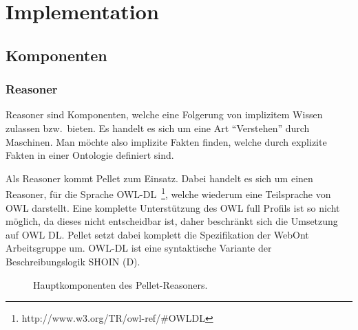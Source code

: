 \chapter{Implementation}
\label{chap:implementation}


\section{Komponenten}
\label{sec:komponenten}

\subsection{Reasoner}
\label{subsec:reasoner}
Reasoner sind Komponenten, welche eine Folgerung von implizitem Wissen zulassen bzw.\ bieten. Es handelt es sich um eine Art ``Verstehen'' durch Maschinen. Man möchte also implizite Fakten finden, welche durch explizite Fakten in einer Ontologie definiert sind. 

Als Reasoner kommt Pellet zum Einsatz. Dabei handelt es sich um einen Reasoner, für die Sprache OWL-DL~\footnote{http://www.w3.org/TR/owl-ref/\#OWLDL}, welche wiederum eine Teilsprache von OWL darstellt. Eine komplette Unterstützung des OWL full Profils ist so nicht möglich, da dieses nicht entscheidbar ist, daher beschränkt sich die Umsetzung auf OWL DL\@. Pellet setzt dabei komplett die Spezifikation der WebOnt Arbeitsgruppe um. OWL-DL ist eine syntaktische Variante der Beschreibungslogik SHOIN (D).

\begin{figure}[htbp]
\centering {}
\caption{Hauptkomponenten des Pellet-Reasoners.\label{fig:pellet_komponenten}\protect\footnotemark}
\end{figure}

